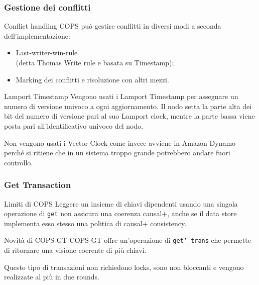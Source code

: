 \begin{frame}
\frametitle{Gestione dei conflitti}
\begin{block}{Conflict handling}
COPS può gestire conflitti in diversi modi a seconda dell'implementazione:
	\begin{itemize}
		\item<1-> Last-writer-win-rule \\
				  (detta Thomas Write rule e basata su Timestamp);
		\item<1-> Marking dei conflitti e risoluzione con altri mezzi.
	\end{itemize}
\end{block}
\begin{block}{Lamport Timestamp}
Vengono usati i Lamport Timestamp per assegnare un numero di versione univoco a ogni aggiornamento.
Il nodo setta la parte alta dei bit del numero di versione pari al suo Lamport clock, mentre la
parte bassa viene posta pari all'identificativo univoco del nodo. \\
\end{block}
Non vengono usati i Vector Clock come invece avviene in Amazon Dynamo perché
si ritiene che in un sistema troppo grande potrebbero andare fuori controllo.
\end{frame}

\begin{frame}
\frametitle{Get Transaction}
\begin{block}{Limiti di COPS}
Leggere un insieme di chiavi dipendenti usando una singola operazione di \texttt{get}
non assicura una coerenza causal+, anche se il data store implementa esso stesso
una politica di causal+ consistency.
\end{block}
\begin{block}{Novità di COPS-GT}
COPS-GT offre un'operazione di \texttt{get\char`_trans} che permette di
ritornare una visione coerente di più chiavi.
\end{block}
Questo tipo di transazioni non richiedono locks, sono non bloccanti e
vengono realizzate al più in due rounds.
\end{frame}

